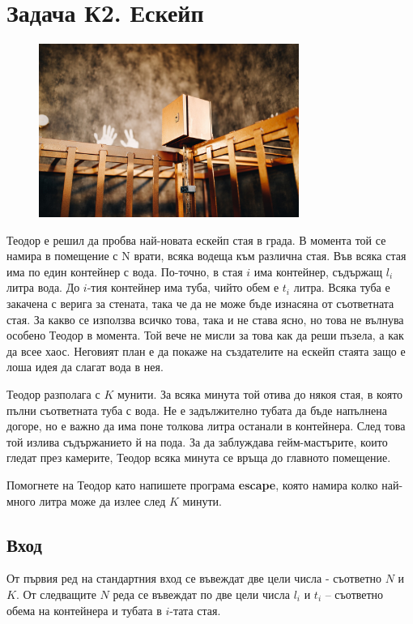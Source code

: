 \documentclass[12pt]{article}
\begin{document}
\section{Задача К2. Ескейп}
\begin{figure}
    \centering
    \includegraphics[width = 8.5cm]{structure/escape_image.png}
\end{figure}
Теодор е решил да пробва най-новата ескейп стая в града. В момента той се намира в помещение с N врати, всяка водеща към различна стая. Във всяка стая има по един контейнер с вода. По-точно, в стая $i$ има контейнер, съдържащ $l_i$ литра вода. До $i$-тия контейнер има туба, чийто обем е $t_i$ литра. Всяка туба е закачена с верига за стената, така че да не може бъде изнасяна от съответната стая. За какво се използва всичко това, така и не става ясно, но това не вълнува особено Теодор в момента. Той вече не мисли за това как да реши пъзела, а как да всее хаос. Неговият план е да покаже на създателите на ескейп стаята защо е лоша идея да слагат вода в нея.

Теодор разполага с $K$ мунити. За всяка минута той отива до някоя стая, в която пълни съответната туба с вода. Не е задължително тубата да бъде напълнена догоре, но е важно да има поне толкова литра останали в контейнера. След това той излива съдържанието й на пода. За да заблуждава гейм-мастърите, които гледат през камерите, Теодор всяка минута се връща до главното помещение.

Помогнете на Теодор като напишете програма \textbf{escape}, която намира колко най-много литра може да излее след $K$ минути.
\subsection{Вход}
От първия ред на стандартния вход се въвеждат две цели числа - съответно $N$ и $K$. От следващите $N$ реда се въвеждат по две цели числа $l_i$ и $t_i$ – съответно обема на контейнера и тубата в $i$-тата стая.
\end{document}
